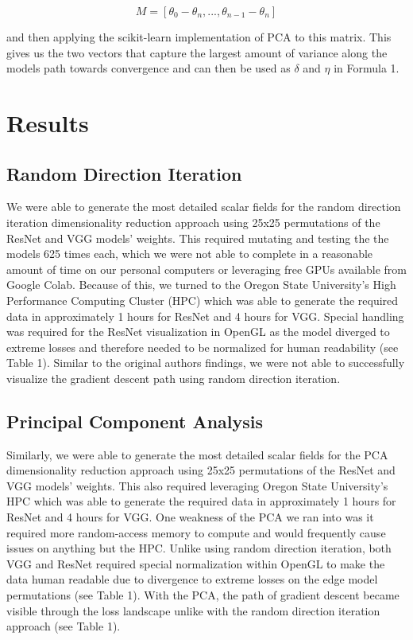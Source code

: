\documentclass{acmsiggraph}
\begin{document}
\begin{equation} \label{eq1}
M = [\theta_0 - \theta_n, . . ., \theta_{n-1} - \theta_n]
\end{equation}

and then applying the scikit-learn implementation of PCA to this matrix. This gives us the two vectors that capture the largest amount of variance along the models path towards convergence and can then be used as $\delta$ and $\eta$ in Formula 1.

\section{Results}
\label{sec:intro}

\subsection{Random Direction Iteration}
We were able to generate the most detailed scalar fields for the random direction iteration dimensionality reduction approach using 25x25 permutations of the ResNet and VGG models' weights. This required mutating and testing the the models 625 times each, which we were not able to complete in a reasonable amount of time on our personal computers or leveraging free GPUs available from Google Colab. Because of this, we turned to the Oregon State University's High Performance Computing Cluster (HPC) which was able to generate the required data in approximately 1 hours for ResNet and 4 hours for VGG. Special handling was required for the ResNet visualization in OpenGL as the model diverged to extreme losses and therefore needed to be normalized for human readability (see Table 1). Similar to the original authors findings, we were not able to successfully visualize the gradient descent path using random direction iteration.

\subsection{Principal Component Analysis}

Similarly, we were able to generate the most detailed scalar fields for the PCA dimensionality reduction approach using 25x25 permutations of the ResNet and VGG models' weights. This also required leveraging Oregon State University's HPC which was able to generate the required data in approximately 1 hours for ResNet and 4 hours for VGG. One weakness of the PCA we ran into was it required more random-access memory to compute and would frequently cause issues on anything but the HPC. Unlike using random direction iteration, both VGG and ResNet required special normalization within OpenGL to make the data human readable due to divergence to extreme losses on the edge model permutations (see Table 1). With the PCA, the path of gradient descent became visible through the loss landscape unlike with the random direction iteration approach (see Table 1).
\end{document}

